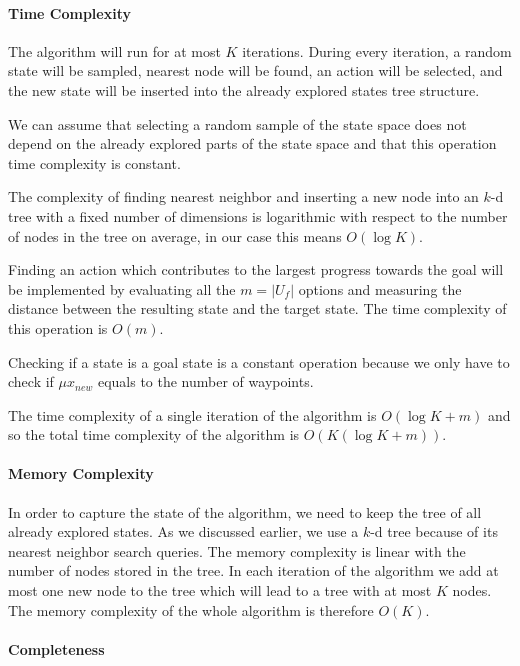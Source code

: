 \paragraph{Time Complexity}

The algorithm will run for at most $K$ iterations. During every iteration, a random state will be sampled, nearest node will be found, an action will be selected, and the new state will be inserted into the already explored states tree structure.

We can assume that selecting a random sample of the state space does not depend on the already explored parts of the state space and that this operation time complexity is constant.

The complexity of finding nearest neighbor and inserting a new node into an $k$-d tree with a fixed number of dimensions is logarithmic with respect to the number of nodes in the tree on average, in our case this means $O(\log K)$.

Finding an action which contributes to the largest progress towards the goal will be implemented by evaluating all the $m=|U_f|$ options and measuring the distance between the resulting state and the target state. The time complexity of this operation is $O(m)$.

Checking if a state is a goal state is a constant operation because we only have to check if $\mu{x_{new}}$ equals to the number of waypoints.

The time complexity of a single iteration of the algorithm is $O(\log K + m)$ and so the total time complexity of the algorithm is $O\left(K(\log K+m)\right)$.

\paragraph{Memory Complexity}

In order to capture the state of the algorithm, we need to keep the tree of all already explored states. As we discussed earlier, we use a $k$-d tree because of its nearest neighbor search queries. The memory complexity is linear with the number of nodes stored in the tree. In each iteration of the algorithm we add at most one new node to the tree which will lead to a tree with at most $K$ nodes. The memory complexity of the whole algorithm is therefore $O(K)$.

\paragraph{Completeness}

